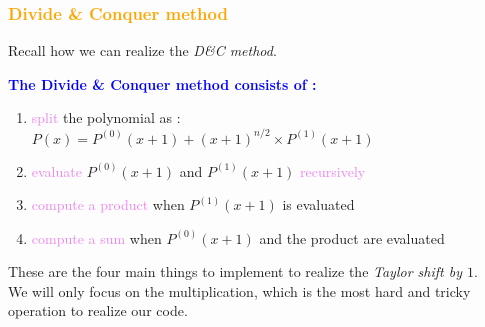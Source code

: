 \begin{frame}[fragile]
\frametitle{\textbf{\textcolor{orange}{Divide \& Conquer method}}}

Recall how we can realize the \textit{D{\&}C method}.

\begin{block}{}
\textcolor{blue}{\textbf{The Divide \& Conquer method consists of :}}

\begin{enumerate}
\item \textcolor{violet}{split} the polynomial as : $P(x) = P^{(0)}(x+1)+(x+1)^{n/2}\times P^{(1)}(x+1)$
\item \textcolor{violet}{evaluate} $P^{(0)}(x+1)$ and $P^{(1)}(x+1)$ \textcolor{violet}{recursively}
\item \textcolor{violet}{compute a product} when $P^{(1)}(x+1)$ is evaluated
\item \textcolor{violet}{compute a sum} when $P^{(0)}(x+1)$ and the product are evaluated
\end{enumerate}
\end{block}

These are the four main things to implement to realize the \textit{Taylor shift by $1$}.\\
We will only focus on the multiplication, which is the most hard and tricky operation to realize our code.

\end{frame}



